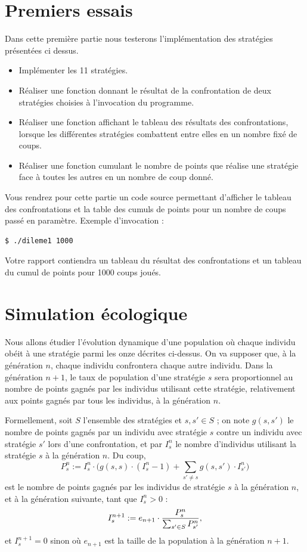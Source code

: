 \documentclass[11pt]{article}
\begin{document}
\section{Premiers essais}

Dans cette première partie nous testerons l'implémentation des stratégies présentées ci dessus.

\begin{itemize}
 \item Implémenter les 11 stratégies.
 \item Réaliser une fonction donnant le résultat de la confrontation de deux stratégies choisies à l'invocation du programme.
 \item Réaliser une fonction affichant le tableau des résultats des confrontations, lorsque les différentes stratégies combattent entre elles en un nombre fixé de coups.
 \item Réaliser une fonction cumulant le nombre de points que réalise une stratégie face à toutes les autres en un nombre de coup donné.
\end{itemize}

Vous rendrez pour cette partie un code source permettant d'afficher le tableau des confrontations et la table des cumuls de points pour un nombre de coups passé en paramètre. Exemple d'invocation : 

\begin{verbatim}
$ ./dileme1 1000
\end{verbatim}

Votre rapport contiendra un tableau du résultat des confrontations et un tableau du cumul de points pour 1000 coups joués.

\section{Simulation écologique}

Nous allons étudier l'évolution dynamique d'une population où chaque individu
obéit à une stratégie parmi les onze décrites ci-dessus. On va supposer que,
à la génération $n$, chaque individu confrontera chaque autre individu.
Dans la génération $n+1$, le taux de population d'une stratégie $s$ sera
proportionnel au nombre de points gagnés par les individus utilisant
cette stratégie, relativement aux points gagnés par tous les individus, 
à la génération $n$.

Formellement, soit $S$ l'ensemble des stratégies et $s,s'\in S$ ;
on note $g(s,s')$ le nombre
de points gagnés par un individu avec stratégie $s$ contre un individu avec
stratégie $s'$ lors d'une confrontation, et par $I^{n}_s$ le nombre d'individus utilisant
la stratégie $s$ à la génération $n$. Du coup,
$$P^n_s:=I^n_s\cdot\bigg(g(s,s)\cdot(I^n_s-1)+\sum_{s'\ne s}g(s,s')\cdot I^n_{s'}\bigg)$$
est le nombre de points gagnés par les individus de stratégie $s$ à la génération $n$, et à la génération suivante, tant que $I^{n}_s>0$ :
$$I^{n+1}_s:=e_{n+1}\cdot {P^n_s\over \sum_{s'\in S} P^n_{s'}},$$
et $I^{n+1}_s=0$ sinon
où $e_{n+1}$ est la taille de la population à la génération $n+1$.
\end{document}
